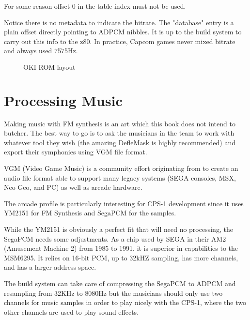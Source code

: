 For some reason offset 0 in the table index must not be used.



Notice there is no metadata to indicate the bitrate. The "database" entry is a plain offset directly pointing to ADPCM nibbles. It is up to the build system to carry out this info to the z80. In practice, Capcom games never mixed bitrate and always used 7575Hz.

\begin{figure}[H]
\caption*{OKI ROM layout\cite{MSM6295_datasheet}}
\end{figure}















\section{Processing Music}
Making music with FM synthesis is an art which this book does not intend to butcher. The best way to go is to ask the musicians in the team to work with whatever tool they wish (the amazing DefleMask is highly recommended) and export their symphonies using VGM file format.

VGM (Video Game Music) is a community effort originating from  to create an audio file format able to support many legacy systems (SEGA consoles, MSX, Neo Geo, and PC) as well as arcade hardware.

The arcade profile is particularly interesting for CPS-1 development since it uses YM2151 for FM Synthesis and SegaPCM for the samples.

While the YM2151 is obviously a perfect fit that will need no processing, the SegaPCM needs some adjustments. As a chip used by SEGA in their AM2 (Amusement Machine 2) from 1985 to 1991, it is superior in capabilities to the MSM6295. It relies on 16-bit PCM, up to 32kHZ sampling, has more channels, and has a larger address space.

The build system can take care of compressing the SegaPCM to ADPCM and resampling from 32KHz to 8080Hz but the musicians should only use two channels for music samples in order to play nicely with the CPS-1, where the two other channels are used to play sound effects.


